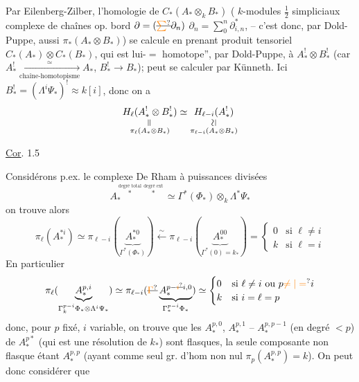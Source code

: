Par Eilenberg-Zilber, l'homologie de $C_*(A_*\otimes_k B_*)$ (  $k$-modules $\tfrac12$ simpliciaux   complexe de chaînes  op. bord $\partial=(\deleted{\unsure{\sum}}\partial_n)$ $\partial_n=\sum_0^n\partial_{i,n}^*$, -- c'est donc, par Dold-Puppe, aussi $\pi_*(A_*\otimes B_*)$) se calcule en prenant   produit tensoriel  $C_*(A_*)\otimes C_*(B_*)$, qui est lui-$=$ homotope'', par Dold-Puppe, à  $A_*^!\otimes B_*^!$ (car $A_*^!\xrightarrow[\text{chaîne-homotopisme}]{\simeq} A_*$, $B_*^!\to B_*$);   peut se calculer par Künneth. Ici $B_*^!=(\Lambda^i\Psi_*)^!\approx k[i]$, donc on  a
\[
 \underset{\substack{\rotatebox{90}{$=$}\\\pi_{\ell}(A_*\otimes B_*)}}{H_{\ell}(A_*^!\otimes B_*^!)}
 \simeq\underset{\substack{\rotatebox{90}{$\simeq$}\\\pi_{\ell-i}(A_*\otimes B_*)}}{H_{\ell-i}(A_*^!)}
\]

\uline{Cor}. 1.5

Considérons p.ex. le complexe   De Rham à puissances divisées
\margin{$\big|$}
\[
 A_*^{\overset{\text{degré total}}{*}\overset{\text{degré ext}}{*}}\simeq\Gamma^*(\Phi_*)\otimes_k\Lambda^*\Psi_*
\]
on trouve  alors
\[
 \pi_\ell(A_*^{*i})\simeq\pi_{\ell-i}(\underbrace{A_*^{*0}}_{\Gamma^*(\Phi_*)})
 \xleftarrow{\sim}\pi_{\ell-i}(\underbrace{A_*^{00}}_{\Gamma^*(0)=k_*})
 =\begin{cases}0&\text{si }\ell\ne i\\ k&\text{si }\ell=i\end{cases}
\]
En  particulier 
\[
 \pi_\ell(\underbrace{A_*^{p,i}}_{\Gamma_k^{p-i}\Phi_*\otimes\Lambda^i\Psi_*})
 \simeq\pi_{\ell-i}(\deleted{\unsure{\Gamma}}\underbrace{A_*^{p-\deleted{\unsure{i}}i,0}}_{\Gamma_*^{p-i}\Phi_*})
 \simeq\begin{cases}0&\text{si }\ell\ne i\text{ ou }p\unsure{\ne|=}i\\ k&\text{si }i=\ell=p\end{cases}
\]
donc, pour $p$ fixé, $i$ variable, on trouve que les  $A_*^{p,0}$, $A_*^{p,1}$ -- $A_*^{p,p-1}$  (en degré $<p$) de $A_*^{p*}$  (qui est une résolution de $k_*$) sont flasques, la seule composante non flasque étant $A_*^{p,p}$ (ayant comme seul gr. d'hom non nul $\pi_p(A_*^{p,p})=k$). On peut donc considérer que

